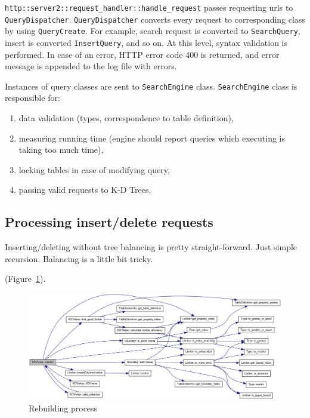 \documentclass[10pt,a4paper]{article}
\begin{document}
\verb|http::server2::request_handler::handle_request| passes requesting urls to \verb|QueryDispatcher|. \verb|QueryDispatcher| converts every request to corresponding class by using \verb|QueryCreate|. For example, search request is converted to \verb|SearchQuery|, insert is converted \verb|InsertQuery|, and so on. At this level, syntax validation is performed. In case of an error, HTTP error code 400 is returned, and error message is appended to the log file with errors. 

Instances of query classes are sent to \verb|SearchEngine| class. \verb|SearchEngine| class is responsible for:
\begin{enumerate}
\item data validation (types, correspondence to table definition),
\item measuring running time (engine should report queries which executing is taking too much time),
\item locking tables in case of modifying query,
\item passing valid requests to K-D Trees.
\end{enumerate}

\subsection{Processing insert/delete requests}

Inserting/deleting without tree balancing is pretty straight-forward. Just simple recursion. Balancing is a little bit tricky. 

 (Figure~\ref{fig:rebuild}).

\begin{figure}
\centering
  \includegraphics[width=16cm]{rebuild}
  \caption{Rebuilding process}
  \label{fig:rebuild}
\end{figure}
\end{document}

